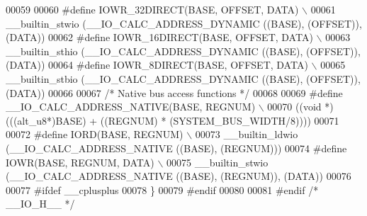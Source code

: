 \begin{DoxyCode}
00059 
00060 \textcolor{preprocessor}{#define IOWR\_32DIRECT(BASE, OFFSET, DATA) \(\backslash\)}
00061 \textcolor{preprocessor}{  \_\_builtin\_stwio (\_\_IO\_CALC\_ADDRESS\_DYNAMIC ((BASE), (OFFSET)), (DATA))}
00062 \textcolor{preprocessor}{#define IOWR\_16DIRECT(BASE, OFFSET, DATA) \(\backslash\)}
00063 \textcolor{preprocessor}{  \_\_builtin\_sthio (\_\_IO\_CALC\_ADDRESS\_DYNAMIC ((BASE), (OFFSET)), (DATA))}
00064 \textcolor{preprocessor}{#define IOWR\_8DIRECT(BASE, OFFSET, DATA) \(\backslash\)}
00065 \textcolor{preprocessor}{  \_\_builtin\_stbio (\_\_IO\_CALC\_ADDRESS\_DYNAMIC ((BASE), (OFFSET)), (DATA))}
00066 
00067 \textcolor{comment}{/* Native bus access functions */}
00068 
00069 \textcolor{preprocessor}{#define \_\_IO\_CALC\_ADDRESS\_NATIVE(BASE, REGNUM) \(\backslash\)}
00070 \textcolor{preprocessor}{  ((void *)(((alt\_u8*)BASE) + ((REGNUM) * (SYSTEM\_BUS\_WIDTH/8))))}
00071 
00072 \textcolor{preprocessor}{#define IORD(BASE, REGNUM) \(\backslash\)}
00073 \textcolor{preprocessor}{  \_\_builtin\_ldwio (\_\_IO\_CALC\_ADDRESS\_NATIVE ((BASE), (REGNUM)))}
00074 \textcolor{preprocessor}{#define IOWR(BASE, REGNUM, DATA) \(\backslash\)}
00075 \textcolor{preprocessor}{  \_\_builtin\_stwio (\_\_IO\_CALC\_ADDRESS\_NATIVE ((BASE), (REGNUM)), (DATA))}
00076 
00077 \textcolor{preprocessor}{#ifdef \_\_cplusplus}
00078 \}
00079 \textcolor{preprocessor}{#endif}
00080 
00081 \textcolor{preprocessor}{#endif }\textcolor{comment}{/* \_\_IO\_H\_\_ */}\textcolor{preprocessor}{}
\end{DoxyCode}
